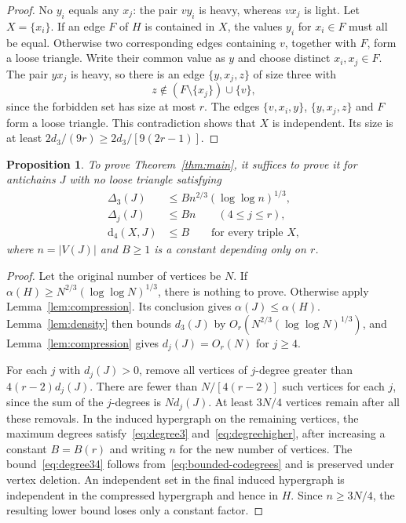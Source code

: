 \documentclass[11pt]{article}
\numberwithin{equation}{section}
\newtheorem{proposition}[theorem]{Proposition}
\theoremstyle{remark}
\newcommand{\dd}{\mathrm d}
\begin{document}
\begin{proof}
No $y_i$ equals any $x_j$: the pair $vy_i$ is heavy, whereas $vx_j$ is light. Let $X=\{x_i\}$. If an edge $F$ of $H$ is contained in $X$, the values $y_i$ for $x_i\in F$ must all be equal. Otherwise two corresponding edges containing $v$, together with $F$, form a loose triangle. Write their common value as $y$ and choose distinct $x_i,x_j\in F$. The pair $yx_j$ is heavy, so there is an edge $\{y,x_j,z\}$ of size three with
\[
 z\notin(F\setminus\{x_j\})\cup\{v\},
\]
since the forbidden set has size at most $r$. The edges $\{v,x_i,y\}$, $\{y,x_j,z\}$ and $F$ form a loose triangle. This contradiction shows that $X$ is independent. Its size is at least $2d_3/(9r)\ge2d_3/[9(2r-1)]$.
\end{proof}

\begin{proposition}\label{prop:reduction}
To prove Theorem~\ref{thm:main}, it suffices to prove it for antichains $J$ with no loose triangle satisfying
\begin{align}
 \Delta_3(J)&\le B n^{2/3}(\log\log n)^{1/3},\label{eq:degree3}\\
 \Delta_j(J)&\le Bn\qquad(4\le j\le r),\label{eq:degreehigher}\\
 \dd_4(X,J)&\le B\qquad\text{for every triple }X,\label{eq:degree34}
\end{align}
where $n=|V(J)|$ and $B\ge1$ is a constant depending only on $r$.
\end{proposition}
\begin{proof}
Let the original number of vertices be $N$. If $\alpha(H)\ge N^{2/3}(\log\log N)^{1/3}$, there is nothing to prove. Otherwise apply Lemma~\ref{lem:compression}. Its conclusion gives $\alpha(J)\le\alpha(H)$. Lemma~\ref{lem:density} then bounds $d_3(J)$ by $O_r(N^{2/3}(\log\log N)^{1/3})$, and Lemma~\ref{lem:compression} gives $d_j(J)=O_r(N)$ for $j\ge4$.

For each $j$ with $d_j(J)>0$, remove all vertices of $j$-degree greater than $4(r-2)d_j(J)$. There are fewer than $N/[4(r-2)]$ such vertices for each $j$, since the sum of the $j$-degrees is $Nd_j(J)$. At least $3N/4$ vertices remain after all these removals. In the induced hypergraph on the remaining vertices, the maximum degrees satisfy~\eqref{eq:degree3} and~\eqref{eq:degreehigher}, after increasing a constant $B=B(r)$ and writing $n$ for the new number of vertices. The bound~\eqref{eq:degree34} follows from~\eqref{eq:bounded-codegrees} and is preserved under vertex deletion. An independent set in the final induced hypergraph is independent in the compressed hypergraph and hence in $H$. Since $n\ge3N/4$, the resulting lower bound loses only a constant factor.
\end{proof}
\end{document}
